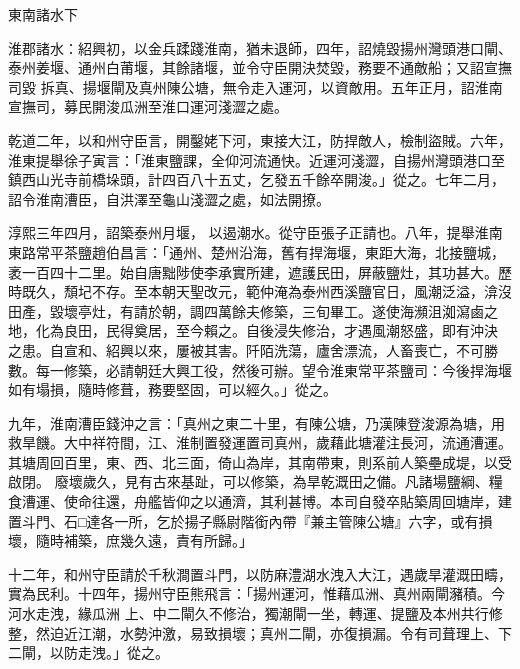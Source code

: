 
\begin{pinyinscope}

 東南諸水下



 淮郡諸水：紹興初，以金兵蹂踐淮南，猶未退師，四年，詔燒毀揚州灣頭港口閘、泰州姜堰、通州白莆堰，其餘諸堰，並令守臣開決焚毀，務要不通敵船；又詔宣撫司毀
 拆真、揚堰閘及真州陳公塘，無令走入運河，以資敵用。五年正月，詔淮南宣撫司，募民開浚瓜洲至淮口運河淺澀之處。



 乾道二年，以和州守臣言，開鑿姥下河，東接大江，防捍敵人，檢制盜賊。六年，淮東提舉徐子寅言：「淮東鹽課，全仰河流通快。近運河淺澀，自揚州灣頭港口至鎮西山光寺前橋垛頭，計四百八十五丈，乞發五千餘卒開浚。」從之。七年二月，詔令淮南漕臣，自洪澤至龜山淺澀之處，如法開撩。



 淳熙三年四月，詔築泰州月堰，
 以遏潮水。從守臣張子正請也。八年，提舉淮南東路常平茶鹽趙伯昌言：「通州、楚州沿海，舊有捍海堰，東距大海，北接鹽城，袤一百四十二里。始自唐黜陟使李承實所建，遮護民田，屏蔽鹽灶，其功甚大。歷時既久，頹圮不存。至本朝天聖改元，範仲淹為泰州西溪鹽官日，風潮泛溢，渰沒田產，毀壞亭灶，有請於朝，調四萬餘夫修築，三旬畢工。遂使海瀕沮洳瀉鹵之地，化為良田，民得奠居，至今賴之。自後浸失修治，才遇風潮怒盛，即有沖決
 之患。自宣和、紹興以來，屢被其害。阡陌洗蕩，廬舍漂流，人畜喪亡，不可勝數。每一修築，必請朝廷大興工役，然後可辦。望令淮東常平茶鹽司：今後捍海堰如有塌損，隨時修葺，務要堅固，可以經久。」從之。



 九年，淮南漕臣錢沖之言：「真州之東二十里，有陳公塘，乃漢陳登浚源為塘，用救旱饑。大中祥符間，江、淮制置發運置司真州，歲藉此塘灌注長河，流通漕運。其塘周回百里，東、西、北三面，倚山為岸，其南帶東，則系前人築壘成堤，以受啟閉。
 廢壞歲久，見有古來基趾，可以修築，為旱乾溉田之備。凡諸場鹽綱、糧食漕運、使命往還，舟艦皆仰之以通濟，其利甚博。本司自發卒貼築周回塘岸，建置斗門、石□達各一所，乞於揚子縣尉階銜內帶『兼主管陳公塘』六字，或有損壞，隨時補築，庶幾久遠，責有所歸。」



 十二年，和州守臣請於千秋澗置斗門，以防麻澧湖水洩入大江，遇歲旱灌溉田疇，實為民利。十四年，揚州守臣熊飛言：「揚州運河，惟藉瓜洲、真州兩閘瀦積。今河水走洩，緣瓜洲
 上、中二閘久不修治，獨潮閘一坐，轉運、提鹽及本州共行修整，然迫近江潮，水勢沖激，易致損壞；真州二閘，亦復損漏。令有司葺理上、下二閘，以防走洩。」從之。




\end{pinyinscope}
